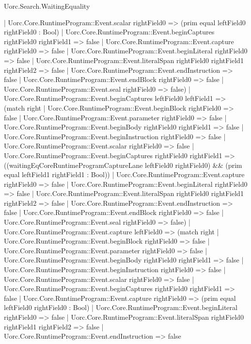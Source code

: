\begin{lexlean}{Uorc.Search.WaitingEquality}
\begin{semanticmodule}
{      | Uorc.Core.RuntimeProgram::Event.scalar rightField0 => (prim equal leftField0 rightField0 : Bool)
      | Uorc.Core.RuntimeProgram::Event.beginCaptures rightField0 rightField1 => false
      | Uorc.Core.RuntimeProgram::Event.capture rightField0 => false
      | Uorc.Core.RuntimeProgram::Event.beginLiteral rightField0 => false
      | Uorc.Core.RuntimeProgram::Event.literalSpan rightField0 rightField1 rightField2 => false
      | Uorc.Core.RuntimeProgram::Event.endInstruction => false
      | Uorc.Core.RuntimeProgram::Event.endBlock rightField0 => false
      | Uorc.Core.RuntimeProgram::Event.seal rightField0 => false)
    | Uorc.Core.RuntimeProgram::Event.beginCaptures leftField0 leftField1 => (match right
      | Uorc.Core.RuntimeProgram::Event.beginBlock rightField0 => false
      | Uorc.Core.RuntimeProgram::Event.parameter rightField0 => false
      | Uorc.Core.RuntimeProgram::Event.beginBody rightField0 rightField1 => false
      | Uorc.Core.RuntimeProgram::Event.beginInstruction rightField0 => false
      | Uorc.Core.RuntimeProgram::Event.scalar rightField0 => false
      | Uorc.Core.RuntimeProgram::Event.beginCaptures rightField0 rightField1 => ((waitingEqCoreRuntimeProgramCaptureLane leftField0 rightField0) && (prim equal leftField1 rightField1 : Bool))
      | Uorc.Core.RuntimeProgram::Event.capture rightField0 => false
      | Uorc.Core.RuntimeProgram::Event.beginLiteral rightField0 => false
      | Uorc.Core.RuntimeProgram::Event.literalSpan rightField0 rightField1 rightField2 => false
      | Uorc.Core.RuntimeProgram::Event.endInstruction => false
      | Uorc.Core.RuntimeProgram::Event.endBlock rightField0 => false
      | Uorc.Core.RuntimeProgram::Event.seal rightField0 => false)
    | Uorc.Core.RuntimeProgram::Event.capture leftField0 => (match right
      | Uorc.Core.RuntimeProgram::Event.beginBlock rightField0 => false
      | Uorc.Core.RuntimeProgram::Event.parameter rightField0 => false
      | Uorc.Core.RuntimeProgram::Event.beginBody rightField0 rightField1 => false
      | Uorc.Core.RuntimeProgram::Event.beginInstruction rightField0 => false
      | Uorc.Core.RuntimeProgram::Event.scalar rightField0 => false
      | Uorc.Core.RuntimeProgram::Event.beginCaptures rightField0 rightField1 => false
      | Uorc.Core.RuntimeProgram::Event.capture rightField0 => (prim equal leftField0 rightField0 : Bool)
      | Uorc.Core.RuntimeProgram::Event.beginLiteral rightField0 => false
      | Uorc.Core.RuntimeProgram::Event.literalSpan rightField0 rightField1 rightField2 => false
      | Uorc.Core.RuntimeProgram::Event.endInstruction => false
}
\end{semanticmodule}
\end{lexlean}
